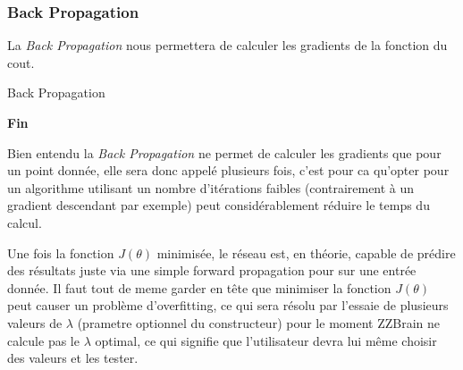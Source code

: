\newpage
\subsubsection{Back Propagation}

La \textit{Back Propagation} nous permettera de calculer les gradients de la fonction du cout.

\begin{algorithm}[H] %
 \caption{Back Propagation}
     \SetAlgoLined
\textbf{Fin}
\end{algorithm}

Bien entendu la \textit{Back Propagation} ne permet de calculer les gradients que pour un point donnée, elle sera donc appelé plusieurs fois, c'est pour ca qu'opter pour un algorithme utilisant un nombre d'itérations faibles (contrairement à un gradient descendant par exemple) peut considérablement réduire le temps du calcul.

Une fois la fonction $J(\theta)$ minimisée, le réseau est, en théorie, capable de prédire des résultats juste via une simple forward propagation pour sur une entrée donnée. Il faut tout de meme garder en tête que minimiser la fonction $J(\theta)$ peut causer un problème d'overfitting, ce qui sera résolu par l'essaie de plusieurs valeurs de $\lambda$ (prametre optionnel du constructeur) pour le moment ZZBrain ne calcule pas le $\lambda$ optimal, ce qui signifie que l'utilisateur devra lui même choisir des valeurs et les tester.
